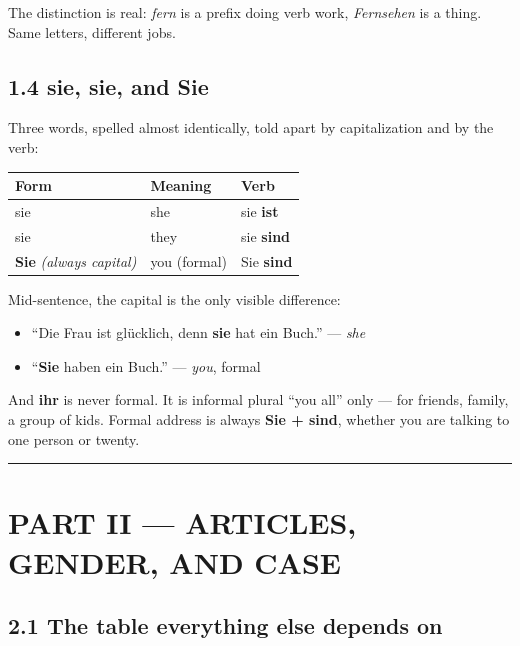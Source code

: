 \documentclass[
  11pt,
]{article}
\newcounter{none} %
\providecommand{\tightlist}{%
  \setlength{\itemsep}{0pt}\setlength{\parskip}{0pt}}
\begin{document}
The distinction is real: \emph{fern} is a prefix doing verb work,
\emph{Fernsehen} is a thing. Same letters, different jobs.

\subsection{1.4 sie, sie, and Sie}\label{sie-sie-and-sie}

Three words, spelled almost identically, told apart by capitalization
and by the verb:

{\def\LTcaptype{none} %
\begin{longtable}[]{@{}lll@{}}
\toprule\noalign{}
Form & Meaning & Verb \\
\midrule\noalign{}
\endhead
\bottomrule\noalign{}
\endlastfoot
sie & she & sie \textbf{ist} \\
sie & they & sie \textbf{sind} \\
\textbf{Sie} \emph{(always capital)} & you (formal) & Sie
\textbf{sind} \\
\end{longtable}
}

Mid-sentence, the capital is the only visible difference:

\begin{itemize}
\tightlist
\item
  ``Die Frau ist glücklich, denn \textbf{sie} hat ein Buch.'' ---
  \emph{she}
\item
  ``\textbf{Sie} haben ein Buch.'' --- \emph{you}, formal
\end{itemize}

And \textbf{ihr} is never formal. It is informal plural ``you all'' only
--- for friends, family, a group of kids. Formal address is always
\textbf{Sie + sind}, whether you are talking to one person or twenty.

\begin{center}\rule{0.5\linewidth}{0.5pt}\end{center}

\section{PART II --- ARTICLES, GENDER, AND
CASE}\label{part-ii-articles-gender-and-case}

\subsection{2.1 The table everything else depends
on}\label{the-table-everything-else-depends-on}
\end{document}
